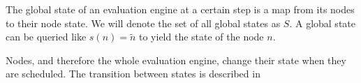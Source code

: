 The global state of an evaluation engine at a certain step is a map from its nodes to their node state.
We will denote the set of all global states as \(S\).
A global state can be queried like \(s(n) = \widetilde{n}\) to yield the state of the node \(n\).

Nodes, and therefore the whole evaluation engine, change their state when they are scheduled.
The transition between states is described in 



